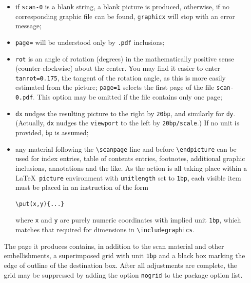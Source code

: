 \documentclass[11pt]{article}
\begin{document}
\begin{itemize}
\item
if {\tt scan-0} is  a blank string, a blank picture is produced, otherwise, if no corresponding graphic file can be found, {\tt graphicx} will stop with an error message;
\item
{\tt page=} will be understood only by {\tt.pdf} inclusions;
\item
{\tt rot} is an angle of rotation (degrees) in the mathematically positive sense (counter-clockwise) about the center. You may find it easier to enter {\tt tanrot=0.175}, the tangent of the rotation angle, as this is more easily estimated from the picture;
{\tt page=1} selects the first page of the file {\tt scan-0.pdf}. This option may be omitted if the file contains only one page;
\item {\tt dx} nudges the resulting picture to the right by {\tt 20bp}, and similarly for {\tt dy}. (Actually, {\tt dx} nudges the {\tt viewport} to the left by {\tt 20bp/scale}.) If no unit is provided, {\tt bp} is assumed;
\item any material following the \verb|\scanpage| line and before \verb|\endpicture| can be used for index entries, table of contents entries, footnotes, additional graphic inclusions, annotations and the like. As the action is all taking place within a \LaTeX\ {\tt picture} environment with {\tt unitlength} set to {\tt1bp}, each visible item must be placed in an instruction of the form
\begin{verbatim}
\put(x,y){...}
\end{verbatim}
where {\tt x} and {\tt y} are purely numeric coordinates with implied unit {\tt 1bp}, which matches that required for dimensions in \verb|\includegraphics|.
\end{itemize}

The page it produces contains, in addition to the scan material and other embellishments, a superimposed grid with unit {\tt 1bp} and a black box marking the edge of outline of the destination box. After all adjustments are complete,  the grid may be suppressed by adding the option {\tt nogrid} to the package option list.
\end{document}
